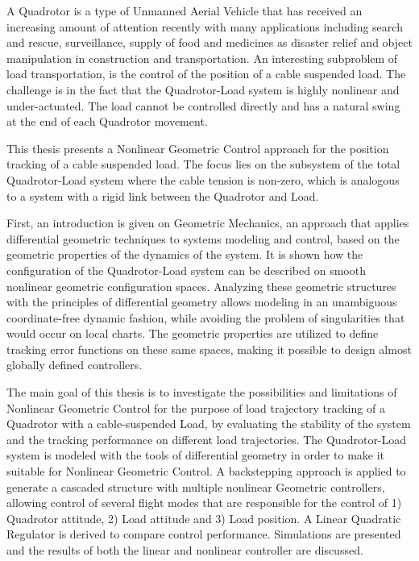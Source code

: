 
A Quadrotor is a type of Unmanned Aerial Vehicle that has received an increasing amount of attention recently with many applications including search and rescue, surveillance, supply of food and medicines as disaster relief and object manipulation in construction and transportation.
An interesting subproblem of load transportation, is the control of the position of a cable suspended load. The challenge is in the fact that the Quadrotor-Load system is highly nonlinear and under-actuated. The load cannot be controlled directly and has a natural swing at the end of each Quadrotor movement. 

This thesis presents a Nonlinear Geometric Control approach for the position tracking of a cable suspended load. 
The focus lies on the subsystem of the total Quadrotor-Load system where the cable tension is non-zero, which is analogous to a system with a rigid link between the Quadrotor and Load.

First, an introduction is given on Geometric Mechanics, an approach that applies differential geometric techniques to systems modeling and control, based on the geometric properties of the dynamics of the system. 
It is shown how the configuration of the Quadrotor-Load system can be described on smooth nonlinear geometric configuration spaces. Analyzing these geometric structures with the principles of differential geometry allows modeling in an unambiguous coordinate-free dynamic fashion, while avoiding the problem of singularities that would occur on local charts. The geometric properties are utilized to define tracking error functions on these same spaces, making it possible to design almost globally defined controllers.

The main goal of this thesis is to investigate the possibilities and limitations of Nonlinear Geometric Control for the purpose of load trajectory tracking of a Quadrotor with a cable-suspended Load, by evaluating the stability of the system and the tracking performance on different load trajectories. 
The Quadrotor-Load system is modeled with the tools of differential geometry in order to make it suitable for Nonlinear Geometric Control.
A backstepping approach is applied to generate a cascaded structure with multiple nonlinear Geometric controllers, allowing control of several flight modes that are responsible for the control of 1) Quadrotor attitude, 2) Load attitude and 3) Load position. 
A Linear Quadratic Regulator is derived to compare control performance. Simulations are presented and the results of both the linear and nonlinear controller are discussed. 

